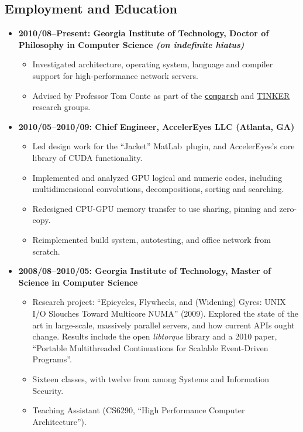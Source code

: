 \documentclass{article}
\newenvironment{tightitemize}
{\begin{itemize}
  \setlength{\itemsep}{1pt}
  \setlength{\parskip}{0pt}
  \setlength{\parsep}{0pt}}
{\end{itemize}}
\begin{document}
\subsection*{Employment and Education}
\begin{tightitemize}
\item \textbf{2010/08--Present: Georgia Institute of Technology,
Doctor of Philosophy in Computer Science
\hfill \tiny\textit{(on indefinite hiatus)}}
\footnotesize
\begin{tightitemize}
\item Investigated architecture, operating system, language and compiler support for high-performance network servers.
\item Advised by Professor Tom Conte as part of the \href{http://comparch.gatech.edu/}{\texttt{comparch}} and \href{http://tinker.cc.gatech.edu/}{TINKER} research groups.
\end{tightitemize}

\item \textbf{2010/05--2010/09: Chief Engineer, AccelerEyes LLC (Atlanta, GA)}
\begin{tightitemize}
\item Led design work for the ``Jacket'' MatLab\textregistered\ plugin, and AccelerEyes's core library of CUDA functionality.
\item Implemented and analyzed GPU logical and numeric codes, including multidimensional convolutions, decompositions, sorting and searching.
\item Redesigned CPU-GPU memory transfer to use sharing, pinning and zero-copy.
\item Reimplemented build system, autotesting, and office network from scratch.
\end{tightitemize}

\item \textbf{2008/08--2010/05: Georgia Institute of Technology, Master of Science in Computer Science}
\begin{tightitemize}
\item Research project: ``Epicycles, Flywheels, and (Widening) Gyres: UNIX I/O
  Slouches Toward Multicore NUMA'' (2009). Explored the state of the art in
  large-scale, massively parallel servers, and how current APIs ought
  change. Results include the open \textit{libtorque} library and a 2010 paper,
  ``Portable Multithreaded Continuations for Scalable Event-Driven Programs''.
\item Sixteen classes, with twelve from among Systems and Information Security.
\item Teaching Assistant (CS6290, ``High Performance Computer Architecture'').
\end{tightitemize}


\end{tightitemize}
\end{document}
